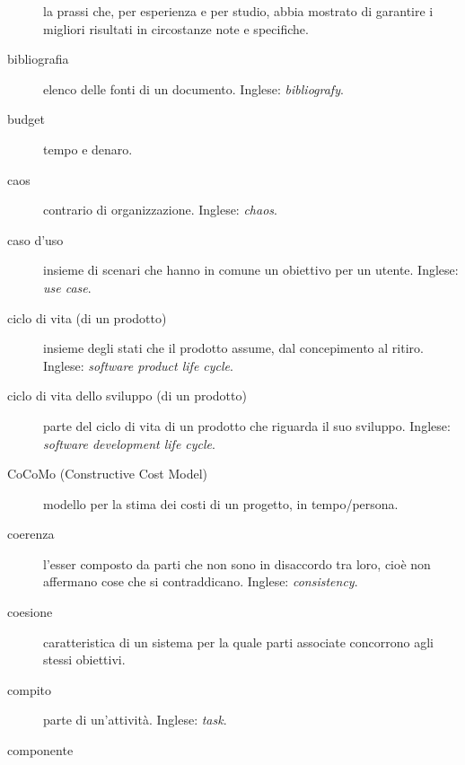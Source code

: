 \documentclass[a4paper]{article}
\begin{document}
\begin{description}
			la prassi che, per esperienza e per studio, abbia mostrato di garantire i migliori risultati in circostanze note e specifiche.
			
	\item[bibliografia] 

			elenco delle fonti di un documento. Inglese: \emph{bibliografy}.
			
	\item[budget] 

			tempo e denaro.
			
	\item[caos] 

			contrario di organizzazione. Inglese: \emph{chaos}.
			
	\item[caso d'uso] 

			insieme di scenari che hanno in comune un obiettivo per un utente. Inglese: \emph{use case}.
			
	\item[ciclo di vita (di un prodotto)] 

			insieme degli stati che il prodotto assume, dal concepimento al ritiro. Inglese: \emph{software product life cycle}.
			
	\item[ciclo di vita dello sviluppo (di un prodotto)] 

			parte del ciclo di vita di un prodotto che riguarda il suo sviluppo. Inglese: \emph{software development life cycle}.
			
	\item[CoCoMo (Constructive Cost Model)] 

			modello per la stima dei costi di un progetto, in tempo/persona.
			
	\item[coerenza] 

			l'esser composto da parti che non sono in disaccordo tra loro, cioè non affermano cose che si contraddicano. Inglese: \emph{consistency}.
			
	\item[coesione] 

			caratteristica di un sistema per la quale parti associate concorrono agli stessi obiettivi.
			
	\item[compito] 

			parte di un'attività. Inglese: \emph{task}.
			
	\item[componente] 


\end{description}
\end{document}
